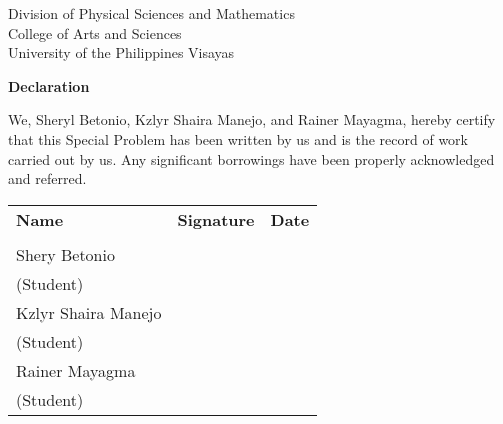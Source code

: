 \begin{center}
	Division of Physical Sciences and Mathematics\\
	College of Arts and Sciences\\
	University of the Philippines Visayas 
	
		\textbf{Declaration}
		\end{center}

We,  Sheryl Betonio, Kzlyr Shaira Manejo, and Rainer Mayagma, hereby certify that this Special Problem has been written by us  and is the record of work carried out by us. Any significant borrowings have been properly acknowledged and referred.

	\begin{tabular}{lll}
	\bfseries Name  & \bfseries Signature & \bfseries Date\\ \\
	Shery Betonio &\signaturerule  & \signaturerule\\ 
	\multicolumn{1}{l}{(Student)} \\ 
	Kzlyr Shaira Manejo &\signaturerule  & \signaturerule\\ 
	\multicolumn{1}{l}{(Student)} \\
	Rainer Mayagma &\signaturerule  & \signaturerule\\ 
\multicolumn{1}{l}{(Student)} \\

\end{tabular}
